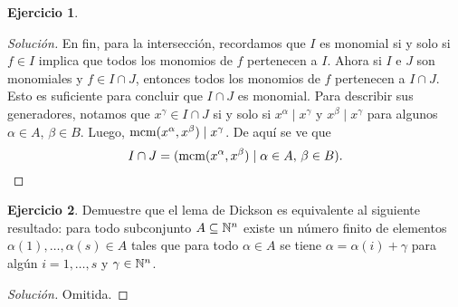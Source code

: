 \documentclass{article}
\theoremstyle{definition}
\newtheorem{ejerc}{Ejercicio}
\newenvironment{solucion}{\begin{proof}[Solución]}{\end{proof}}
\begin{document}
\begin{ejerc}
\begin{solucion}
     \vspace{1em}

     En fin, para la intersección, recordamos que $I$ es monomial si y solo si
     $f\in I$ implica que todos los monomios de $f$ pertenecen a $I$. Ahora si
     $I$ e $J$ son monomiales y $f\in I\cap J$, entonces todos los monomios de
     $f$ pertenecen a $I\cap J$. Esto es suficiente para concluir que $I\cap J$
     es monomial. Para describir sus generadores, notamos que
     $x^\gamma \in I\cap J$ si y solo si $x^\alpha \mid x^\gamma$ y
     $x^\beta \mid x^\gamma$ para algunos $\alpha \in A$, $\beta \in B$. Luego,
     $\operatorname{mcm} (x^\alpha,x^\beta) \mid x^\gamma$. De aquí se ve que
     $$I \cap J = (\operatorname{mcm} (x^\alpha,x^\beta) \mid \alpha\in A, \, \beta\in B).$$
  \end{solucion}\fi
\end{ejerc}

\begin{ejerc}
  Demuestre que el lema de Dickson es equivalente al siguiente resultado: para
  todo subconjunto $A \subseteq \mathbb{N}^n$ existe un número finito de elementos
  $\alpha (1), \ldots, \alpha (s) \in A$ tales que para todo $\alpha \in A$ se
  tiene $\alpha = \alpha (i) + \gamma$ para algún $i = 1,\ldots,s$ y
  $\gamma \in \mathbb{N}^n$.

  \ifdefined\solutions\begin{solucion}
    Omitida.
  \end{solucion}\fi
\end{ejerc}
\end{document}
